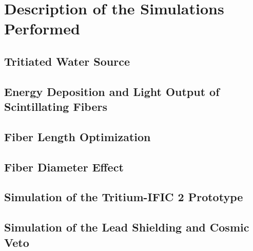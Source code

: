 \documentclass[12pt,a4paper]{book}
\begin{document}
	\section{Description of the Simulations Performed}\label{sec:SimulationsPerformed}
	
	
		\subsection[Tritiated Water Source]{Tritiated Water Source}\label{subsec:SourceShapeSimulation}
		
		
		\subsection[Energy Deposition and Light Output of Scintillating Fibers]{Energy Deposition and Light Output of Scintillating Fibers}\label{subsec:LightOutputFibers}
		
		
		\subsection[Fiber Length]{Fiber Length Optimization}\label{subsec:FiberLengthSimulation}
		
				
		\subsection[Fiber Diameter]{Fiber Diameter Effect}\label{subsec:FiberDiameterSimulation}
		
		
		\subsection[Tritium-IFIC 2]{Simulation of the Tritium-IFIC 2 Prototype}\label{subsec:TritiumIFIC2Simulation}
		
		
		\subsection[Lead Shielding and Cosmic Veto]{Simulation of the Lead Shielding and Cosmic Veto}\label{subsec:LeadCosmicSimulation}
		
		\newpage
				
\end{document}
